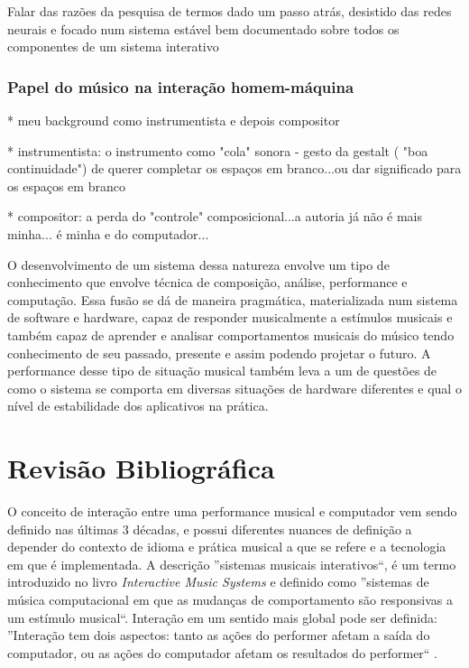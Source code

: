 \documentclass{ppgmus}
\begin{document}
Falar das razões da pesquisa de termos dado um passo atrás, desistido
das redes neurais e focado num sistema estável bem documentado sobre todos
os componentes de um sistema interativo
 



\subsection{Papel do músico na interação homem-máquina}

* meu background como instrumentista e depois compositor

* instrumentista: o instrumento como "cola" sonora - gesto da gestalt ( "boa continuidade") de querer
completar os espaços em branco...ou dar significado para os espaços em branco

* compositor: a perda do "controle" composicional...a autoria já não é mais minha...
é minha e do computador...




O desenvolvimento de um sistema dessa natureza envolve um tipo de conhecimento que envolve técnica de
 composição, análise, performance e computação.
 Essa fusão se dá de maneira pragmática, materializada num sistema de software e hardware, capaz de 
responder musicalmente a estímulos musicais e também capaz de aprender e analisar comportamentos musicais do músico tendo 
conhecimento de seu
passado, presente e assim podendo projetar o futuro. A performance desse tipo de situação musical também leva a um  de questões
de como o sistema se comporta em diversas situações de hardware diferentes e qual 
o nível de estabilidade dos aplicativos na prática.





\chapter{Revisão Bibliográfica}
\label{sec:rev}

O conceito de interação entre uma performance musical e computador vem
sendo definido nas últimas 3 décadas, e possui diferentes nuances de definição
a depender do contexto de idioma e prática musical a que se refere e a tecnologia
em que é implementada. A descrição ''sistemas musicais interativos``, é um
termo introduzido no livro \textit{Interactive Music Systems} 
\cite{rowe93:interactive} e definido como ''sistemas de música 
computacional em que as mudanças de comportamento são responsivas a um
estímulo musical``. Interação em um sentido mais global pode ser definida: 
  ''Interação tem dois aspectos:
tanto as ações do performer afetam a saída do computador, ou as ações do computador
afetam os resultados do performer`` \cite{garnett:2001}.
\end{document}
